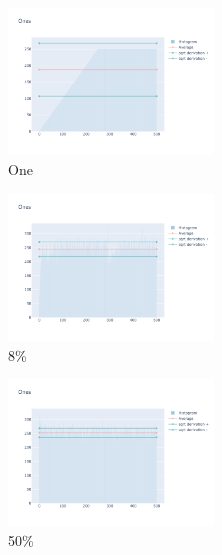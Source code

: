 \documentclass[12pt, fleqn]{report}                             %
\theoremstyle{break}                                            %
\begin{document}
      \begin{figure}[ht!]
        \centering
        \begin{subfigure}[b]{0.4\linewidth}
          \includegraphics[width=0.6\textwidth]{Images/122/dia-a.png}
          \caption{One}
        \end{subfigure}
        \begin{subfigure}[b]{0.4\linewidth}
          \includegraphics[width=0.6\textwidth]{Images/122/dia-b.png}
          \caption{8\%}
        \end{subfigure}
        \begin{subfigure}[b]{0.4\linewidth}
          \includegraphics[width=0.6\textwidth]{Images/122/dia-c.png}
          \caption{50\%}
        \end{subfigure}
        \begin{subfigure}[b]{0.4\linewidth}

\end{subfigure}
\end{figure}
\end{document}
